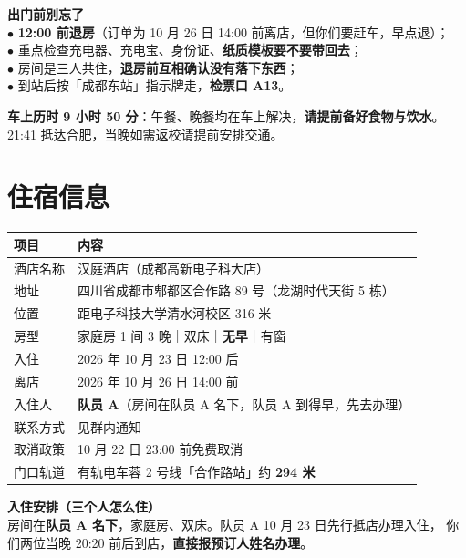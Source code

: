 \documentclass[11pt,a4paper,fontset=windows]{ctexart}
\newcommand{\thd}[1]{\textbf{\color{main}#1}}
\begin{document}
\begin{keybox}
\textbf{出门前别忘了}\\
$\bullet$ \textbf{12:00 前退房}（订单为 10 月 26 日 14:00 前离店，但你们要赶车，早点退）；\\
$\bullet$ 重点检查充电器、充电宝、身份证、\textbf{纸质模板要不要带回去}；\\
$\bullet$ 房间是三人共住，\textbf{退房前互相确认没有落下东西}；\\
$\bullet$ 到站后按「成都东站」指示牌走，\textbf{检票口 A13}。
\end{keybox}

\begin{warnbox}
\textbf{车上历时 9 小时 50 分}：午餐、晚餐均在车上解决，\textbf{请提前备好食物与饮水}。
21:41 抵达合肥，当晚如需返校请提前安排交通。
\end{warnbox}

\newpage

\section{住宿信息}

\begin{center}
\begin{tabularx}{\textwidth}{@{}L{3.0cm}X@{}}
\toprule
\thd{项目} & \thd{内容}\\
\midrule
酒店名称 & 汉庭酒店（成都高新电子科大店）\\
地址 & 四川省成都市郫都区合作路 89 号（龙湖时代天街 5 栋）\\
位置 & 距电子科技大学清水河校区 316 米\\
房型 & 家庭房 1 间 3 晚｜双床｜\textbf{无早}｜有窗\\
入住 & 2026 年 10 月 23 日 12:00 后\\
离店 & 2026 年 10 月 26 日 14:00 前\\
入住人 & \textbf{队员 A}（房间在队员 A 名下，队员 A 到得早，先去办理）\\
联系方式 & 见群内通知\\
取消政策 & 10 月 22 日 23:00 前免费取消\\
门口轨道 & 有轨电车蓉 2 号线「合作路站」约 \textbf{294 米}\\
\bottomrule
\end{tabularx}
\end{center}

\begin{keybox}
\textbf{入住安排（三个人怎么住）}\\
房间在\textbf{队员 A 名下}，家庭房、双床。队员 A 10 月 23 日先行抵店办理入住，
你们两位当晚 20:20 前后到店，\textbf{直接报预订人姓名办理}。
\end{keybox}
\end{document}
